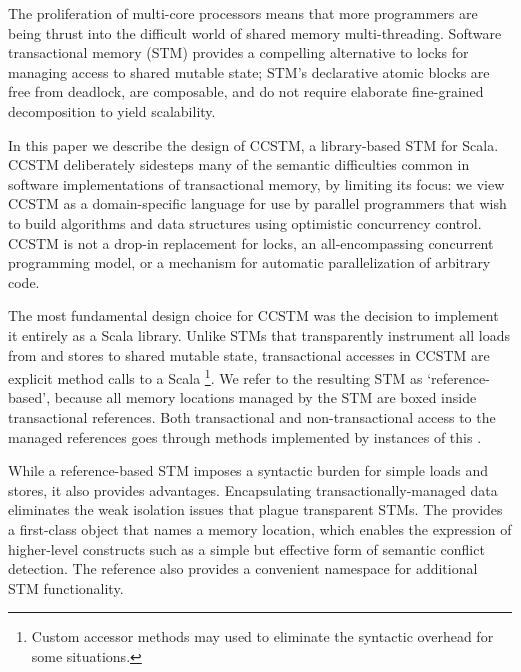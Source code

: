 The proliferation of multi-core processors means that more programmers are
being thrust into the difficult world of shared memory multi-threading.
Software transactional memory (STM) provides a compelling alternative to
locks for managing access to shared mutable state; STM's declarative
atomic blocks are free from deadlock, are composable, and do not
require elaborate fine-grained decomposition to yield scalability.


In this paper we describe the design of CCSTM, a library-based STM
for Scala.  CCSTM deliberately sidesteps many of the 
semantic difficulties common in software implementations of transactional
memory, by limiting its focus: we view CCSTM as a domain-specific language
for use by parallel programmers that wish to build algorithms and data
structures using optimistic concurrency control.  CCSTM is not a drop-in replacement for
locks, an all-encompassing concurrent programming model, or a mechanism
for automatic parallelization of arbitrary code.

The most fundamental design choice for CCSTM was the decision to
implement it entirely as a Scala library.  Unlike STMs that transparently
instrument
all loads from and stores to shared mutable state, transactional accesses in CCSTM are explicit
method calls to a Scala \footnote{Custom accessor methods
may used to eliminate the syntactic overhead for some situations.}.
We refer to the resulting STM as `reference-based', because all memory
locations managed by the STM are boxed inside transactional references.
Both transactional and non-transactional access to the managed references
goes through methods implemented by instances of this .

While a reference-based STM imposes a syntactic burden for simple loads and
stores, it also provides advantages.  Encapsulating transactionally-managed
data eliminates the weak isolation issues that plague transparent STMs.
The  provides
a first-class object that names a memory location, which enables the
expression of higher-level constructs such as a simple but effective form of
semantic conflict detection.
The reference also provides a convenient
namespace for additional STM functionality.

